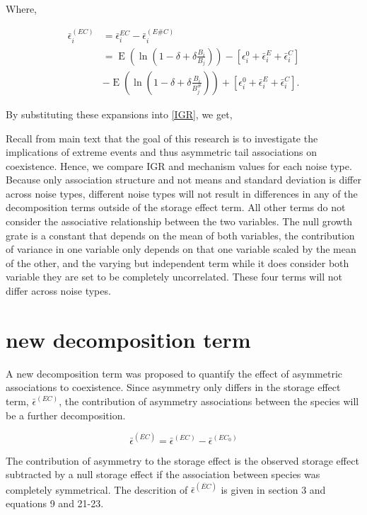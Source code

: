 \documentclass[letterpaper,11pt]{article}
\DeclareMathOperator{\EX}{E}%
\begin{document}
\noindent Where,

\begin{align}
\bar \epsilon_i^{(EC)}&=\bar \epsilon_i^{EC}-\bar \epsilon_i^{(E\#C)}\\
&= \EX(\ln(1-\delta + \delta \frac{B_i}{B_j}))-[\epsilon_i^0 +\bar \epsilon_i^E + \bar \epsilon_i^C]\\
&- \EX(\ln(1-\delta + \delta \frac{B_i}{B_j^{\#}})) +[\epsilon_i^0 +\bar \epsilon_i^E + \bar \epsilon_i^C].
\end{align}

By substituting these expansions into \ref{IGR}, we get, 

Recall from main text that the goal of this research is to investigate the implications of extreme events and thus asymmetric tail associations on coexistence. Hence, we compare IGR and mechanism values for each noise type. Because only association structure and not means and standard deviation is differ across noise types, different noise types will not result in differences in any of the decomposition terms outside of the storage effect term. All other terms do not consider the associative relationship between the two variables. The null growth grate is a constant that depends on the mean of both variables, the contribution of variance in one variable only depends on that one variable scaled by the mean of the other, and the varying but independent term while it does consider both variable they are set to be completely uncorrelated. These four terms will not differ across noise types. 

\section{new decomposition term}

A new decomposition term was proposed to quantify the effect of asymmetric associations to coexistence. Since asymmetry only differs in the storage effect term, $\bar \epsilon^{(EC)}$, the contribution of asymmetry associations between the species will be a further decomposition. 

\begin{equation}
\bar \epsilon^{(\dot {EC})} = \bar \epsilon^{(EC)} - \bar \epsilon^{( {EC_0})}
\end{equation}

The contribution of asymmetry to the storage effect is the observed storage effect subtracted by a null storage effect if the association between species was completely symmetrical. 
The descrition of $\bar \epsilon^{(\ddot {EC})}$ is given in section 3 and equations 9 and 21-23. 
\end{document}

